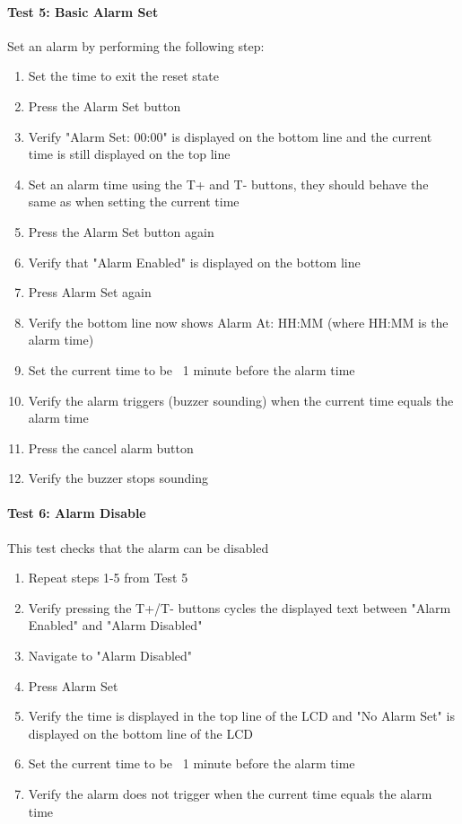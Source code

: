 \documentclass{article}
\begin{document}
\paragraph{Test 5: Basic Alarm Set} Set an alarm by performing the following step:
\begin{enumerate}
    \item Set the time to exit the reset state
    \item Press the Alarm Set button
    \item Verify "Alarm Set: 00:00" is displayed on the bottom line and the current time is still displayed on the top line
    \item Set an alarm time using the T+ and T- buttons, they should behave the same as when setting the current time
    \item Press the Alarm Set button again
    \item Verify that "Alarm Enabled" is displayed on the bottom line
    \item Press Alarm Set again
    \item Verify the bottom line now shows Alarm At: HH:MM (where HH:MM is the alarm time)
    \item Set the current time to be ~1 minute before the alarm time
    \item Verify the alarm triggers (buzzer sounding) when the current time equals the alarm time
    \item Press the cancel alarm button
    \item Verify the buzzer stops sounding
\end{enumerate}

\paragraph{Test 6: Alarm Disable} This test checks that the alarm can be disabled
\begin{enumerate}
    \item Repeat steps 1-5 from Test 5
    \item Verify pressing the T+/T- buttons cycles the displayed text between "Alarm Enabled" and "Alarm Disabled"
    \item Navigate to "Alarm Disabled"
    \item Press Alarm Set
    \item Verify the time is displayed in the top line of the LCD and "No Alarm Set" is displayed on the bottom line of the LCD
    \item Set the current time to be ~1 minute before the alarm time
    \item Verify the alarm does not trigger when the current time equals the alarm time
\end{enumerate}
\end{document}
